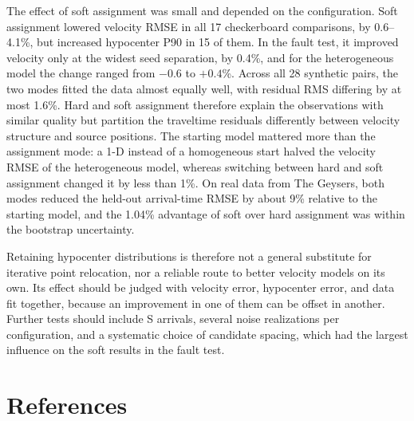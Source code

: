 \documentclass[12pt, a4paper]{article}
\begin{document}
The effect of soft assignment was small and depended on the configuration. Soft assignment lowered velocity RMSE in all 17 checkerboard comparisons, by 0.6--4.1\%, but increased hypocenter P90 in 15 of them. In the fault test, it improved velocity only at the widest seed separation, by 0.4\%, and for the heterogeneous model the change ranged from $-0.6$ to $+0.4$\%. Across all 28 synthetic pairs, the two modes fitted the data almost equally well, with residual RMS differing by at most 1.6\%. Hard and soft assignment therefore explain the observations with similar quality but partition the traveltime residuals differently between velocity structure and source positions. The starting model mattered more than the assignment mode: a 1-D instead of a homogeneous start halved the velocity RMSE of the heterogeneous model, whereas switching between hard and soft assignment changed it by less than 1\%. On real data from The Geysers, both modes reduced the held-out arrival-time RMSE by about 9\% relative to the starting model, and the 1.04\% advantage of soft over hard assignment was within the bootstrap uncertainty.

Retaining hypocenter distributions is therefore not a general substitute for iterative point relocation, nor a reliable route to better velocity models on its own. Its effect should be judged with velocity error, hypocenter error, and data fit together, because an improvement in one of them can be offset in another. Further tests should include S arrivals, several noise realizations per configuration, and a systematic choice of candidate spacing, which had the largest influence on the soft results in the fault test.

\section*{References}
\printbibliography[heading=none]
\end{document}
